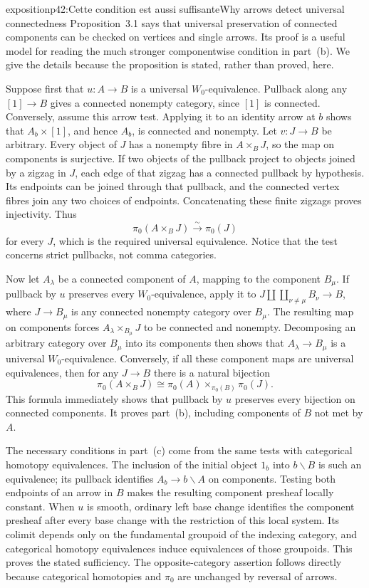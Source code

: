 \begin{dcomment}{exposition}{p42:Cette condition est aussi suffisante}{Why arrows detect universal connectedness}
Proposition~3.1 says that universal preservation of connected components can be checked on vertices and single arrows. Its proof is a useful model for reading the much stronger componentwise condition in part~(b). We give the details because the proposition is stated, rather than proved, here.

Suppose first that $u:A\longrightarrow B$ is a universal $W_0$-equivalence. Pullback along any $[1]\longrightarrow B$ gives a connected nonempty category, since $[1]$ is connected. Conversely, assume this arrow test. Applying it to an identity arrow at $b$ shows that $A_b\times[1]$, and hence $A_b$, is connected and nonempty. Let $v:J\longrightarrow B$ be arbitrary. Every object of $J$ has a nonempty fibre in $A\times_BJ$, so the map on components is surjective. If two objects of the pullback project to objects joined by a zigzag in $J$, each edge of that zigzag has a connected pullback by hypothesis. Its endpoints can be joined through that pullback, and the connected vertex fibres join any two choices of endpoints. Concatenating these finite zigzags proves injectivity. Thus
\[
 \pi_0(A\times_BJ)\xrightarrow{\sim}\pi_0(J)
\]
for every $J$, which is the required universal equivalence. Notice that the test concerns strict pullbacks, not comma categories.

Now let $A_\lambda$ be a connected component of $A$, mapping to the component $B_\mu$. If pullback by $u$ preserves every $W_0$-equivalence, apply it to $J\amalg\coprod_{\nu\ne\mu}B_\nu\longrightarrow B$, where $J\longrightarrow B_\mu$ is any connected nonempty category over $B_\mu$. The resulting map on components forces $A_\lambda\times_{B_\mu}J$ to be connected and nonempty. Decomposing an arbitrary category over $B_\mu$ into its components then shows that $A_\lambda\longrightarrow B_\mu$ is a universal $W_0$-equivalence. Conversely, if all these component maps are universal equivalences, then for any $J\longrightarrow B$ there is a natural bijection
\[
 \pi_0(A\times_BJ)\cong
 \pi_0(A)\times_{\pi_0(B)}\pi_0(J).
\]
This formula immediately shows that pullback by $u$ preserves every bijection on connected components. It proves part~(b), including components of $B$ not met by $A$.

The necessary conditions in part~(c) come from the same tests with categorical homotopy equivalences. The inclusion of the initial object $1_b$ into $b\backslash B$ is such an equivalence; its pullback identifies $A_b\longrightarrow b\backslash A$ on components. Testing both endpoints of an arrow in $B$ makes the resulting component presheaf locally constant. When $u$ is smooth, ordinary left base change identifies the component presheaf after every base change with the restriction of this local system. Its colimit depends only on the fundamental groupoid of the indexing category, and categorical homotopy equivalences induce equivalences of those groupoids. This proves the stated sufficiency. The opposite-category assertion follows directly because categorical homotopies and $\pi_0$ are unchanged by reversal of arrows.
\end{dcomment}

